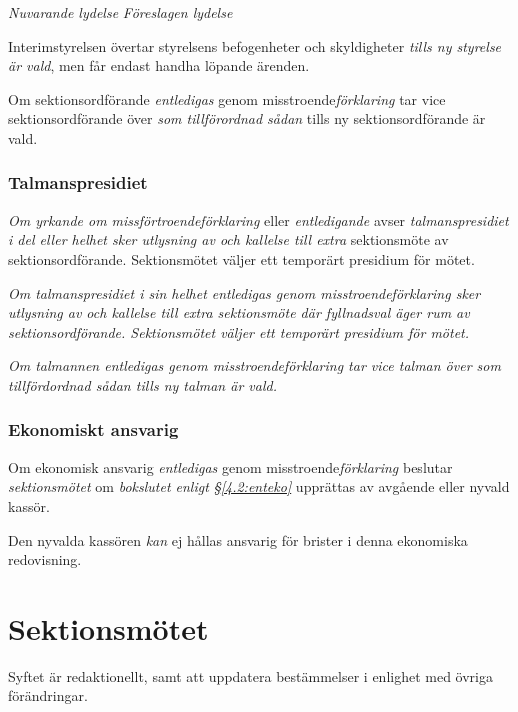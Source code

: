 \documentclass{article}
\newenvironment{lydelse}
    {\begin{paracol}{2}%
        \emph{Nuvarande lydelse}%
        \switchcolumn%
        \emph{Föreslagen lydelse}%
    \end{paracol}%
    \begin{enumerate}[label=\thesubsection.\arabic*]%
    \begin{paracol}{2}%
    }{\end{paracol}\end{enumerate}}
\begin{document}
\begin{lydelse}
    \item Interimstyrelsen övertar styrelsens befogenheter och skyldigheter \emph{tills ny styrelse är vald}, men får endast handha löpande ärenden.

    \item Om sektionsordförande \emph{entledigas} genom misstroende\emph{förklaring} tar vice sektionsordförande över \emph{som tillförordnad sådan} tills ny sektionsordförande är vald.

    \subsubsection*{Talmanspresidiet}
    \item \emph{Om yrkande om missförtroendeförklaring} eller \emph{entledigande} avser \emph{talmanspresidiet i del eller helhet sker utlysning av och kallelse till extra} sektionsmöte av sektionsordförande.
    Sektionsmötet väljer ett temporärt presidium för mötet.

    \item \emph{Om talmanspresidiet i sin helhet entledigas genom misstroendeförklaring sker utlysning av och kallelse till extra sektionsmöte där fyllnadsval äger rum av sektionsordförande.
    Sektionsmötet väljer ett temporärt presidium för mötet.}

    \item \emph{Om talmannen entledigas genom misstroendeförklaring tar vice talman över som tillfördordnad sådan tills ny talman är vald.}
      
    \subsubsection*{Ekonomiskt ansvarig}
    \item Om ekonomisk ansvarig \emph{entledigas} genom misstroende\emph{förklaring} beslutar \emph{sektionsmötet} om \emph{bokslutet enligt \S\ref{4.2:enteko}} upprättas av avgående eller nyvald kassör.

    \item Den nyvalda kassören \emph{kan} ej hållas ansvarig för brister i denna ekonomiska redovisning.

\end{lydelse}

\section{Sektionsmötet}
Syftet är redaktionellt, samt att uppdatera bestämmelser i enlighet med övriga förändringar.
\end{document}

